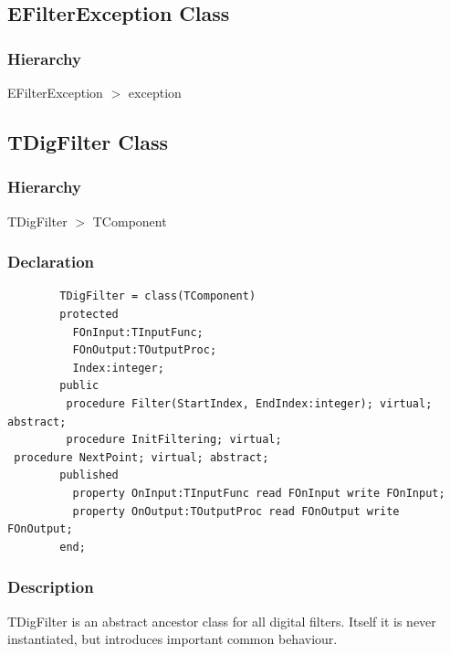 \documentclass[12pt,a4paper,oneside]{report}
\begin{document}
\subsection{EFilterException Class}
\label{lmfilters.EFilterException}
\subsubsection{Hierarchy}
EFilterException {$>$} exception
\subsection{TDigFilter Class}
\label{lmfilters.TDigFilter}
\subsubsection{Hierarchy}
TDigFilter {$>$} TComponent
\subsubsection{Declaration}
	\begin{verbatim}
		TDigFilter = class(TComponent)
		protected
		  FOnInput:TInputFunc;
		  FOnOutput:TOutputProc;
		  Index:integer;
		public
		 procedure Filter(StartIndex, EndIndex:integer); virtual; abstract;
		 procedure InitFiltering; virtual;
 procedure NextPoint; virtual; abstract;
		published
		  property OnInput:TInputFunc read FOnInput write FOnInput;
		  property OnOutput:TOutputProc read FOnOutput write FOnOutput;
		end;
		\end{verbatim}
\subsubsection{Description}
TDigFilter is an abstract ancestor class for all digital filters. Itself it is never instantiated, but introduces important common behaviour. 
\end{document}
